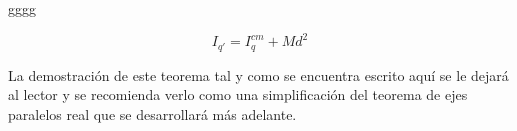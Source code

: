 \documentclass[/home/hernan/Documentos/Apuntes_mecanica_teorica/main.tex]{subfiles}
\begin{document}
    \begin{definition}
        gggg
    \end{definition}

    \begin{theorem}
        \begin{equation}
            I_{{q}'}= I_{q}^{cm} + Md^{2}
        \end{equation}

        La demostración de este teorema tal y como se encuentra escrito aquí se le dejará al lector y se recomienda verlo como una simplificación del teorema de ejes paralelos real que se desarrollará más adelante.
    \end{theorem}
\end{document}
